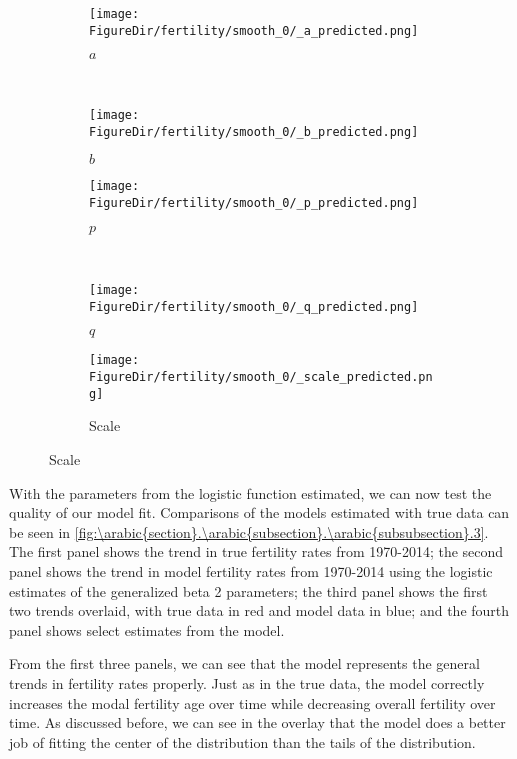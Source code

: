 \documentclass[10pt]{article}
\renewcommand{\thesection}{\arabic{section}}
\renewcommand{\thesubsection}{\thesection.\arabic{subsection}}
\renewcommand{\thesubsubsection}{\thesubsection.\arabic{subsubsection}}
\numberwithin{equation}{subsection}
\newcommand*{\FigureDir}{../../graphs}
\begin{document}
\begin{figure}[!ht]
	\centering
   \caption{\label{fig:\thesubsubsection.2}Fertility Generalized Beta 2 Parameter Estimates}
		\begin{subfigure}{0.5\textwidth}
			\centering
			\texttt{[image: \\FigureDir/fertility/smooth\_0/\_a\_predicted.png]}
			\caption{\(a\)}
		\end{subfigure}%
		~ %
		\begin{subfigure}{0.5\textwidth}
			\centering
			\texttt{[image: \\FigureDir/fertility/smooth\_0/\_b\_predicted.png]}
			\caption{\(b\)}
		\end{subfigure}%
		\newline
		\begin{subfigure}{0.5\textwidth}
			\centering
			\texttt{[image: \\FigureDir/fertility/smooth\_0/\_p\_predicted.png]}
			\caption{\(p\)}
		\end{subfigure}%
		~ %
		\begin{subfigure}{0.5\textwidth}
			\centering
			\texttt{[image: \\FigureDir/fertility/smooth\_0/\_q\_predicted.png]}
			\caption{\(q\)}
      \end{subfigure}%
      \newline
		\begin{subfigure}{0.5\textwidth}
			\centering
			\texttt{[image: \\FigureDir/fertility/smooth\_0/\_scale\_predicted.png]}
			\caption{Scale}
		\end{subfigure}%
\end{figure}

\par With the parameters from the logistic function estimated, we can now test the quality of our model fit. Comparisons of the models estimated with true data can be seen in \autoref{fig:\thesubsubsection.3}. The first panel shows the trend in true fertility rates from 1970-2014; the second panel shows the trend in model fertility rates from 1970-2014 using the logistic estimates of the generalized beta 2 parameters; the third panel shows the first two trends overlaid, with true data in red and model data in blue; and the fourth panel shows select estimates from the model.

\par From the first three panels, we can see that the model represents the general trends in fertility rates properly. Just as in the true data, the model correctly increases the modal fertility age over time while decreasing overall fertility over time. As discussed before, we can see in the overlay that the model does a better job of fitting the center of the distribution than the tails of the distribution.
\end{document}
